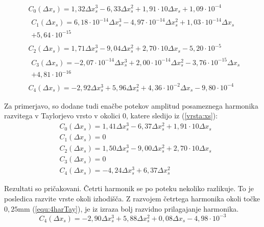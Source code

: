\begin{eqnarray}
\label{nap_lin_xs}
&C_0(\Delta x_s) =1,32\Delta x_s^{3}-6,33\Delta x_s^{2}+1,91\cdot 10\Delta x_s+1,09\cdot 10^{-4} \\                                    
&\begin{split}C_1(\Delta x_s) =6,18\cdot 10^{-14}\Delta x_s^{3}-4,97\cdot 10^{-14}\Delta x_s^{2}+1,03\cdot 10^{-14}\Delta x_s\\+5,64\cdot 10^{-15} \end{split}\\ 
&C_2(\Delta x_s) =1,71\Delta x_s^{3}-9,04\Delta x_s^{2}+2,70\cdot 10\Delta x_s-5,20\cdot 10^{-5} \\                                    
&\begin{split}C_3(\Delta x_s) =-2,07\cdot 10^{-14}\Delta x_s^{3}+2,00\cdot 10^{-14}\Delta x_s^{2}-3,76\cdot 10^{-15}\Delta x_s\\+4,81\cdot 10^{-16} \end{split}\\
\label{nap_lin_xs_zadnji}
&C_4(\Delta x_s) =-2,92\Delta x_s^{3}+5,96\Delta x_s^{2}+4,36\cdot 10^{-2}\Delta x_s-9,80\cdot 10^{-4}
\end{eqnarray}

Za primerjavo, so dodane tudi enačbe potekov amplitud posameznega harmonika razvitega v Taylorjevo vrsto v okolici 0, katere sledijo iz (\ref{vrsta:xs}):
\begin{eqnarray}
&C_0(\Delta x_s) =1,41\Delta x_s^{3}-6,37\Delta x_s^{2}+1,91\cdot 10\Delta x_s \\
&C_1(\Delta x_s) = 0\\
&C_2(\Delta x_s) =1,50\Delta x_s^{3}-9,00\Delta x_s^{2}+2,70\cdot 10\Delta x_s\\
&C_3(\Delta x_s) = 0\\
&C_4(\Delta x_s) =-4,24\Delta x_s^{3}+6,37\Delta x_s^{2}
\end{eqnarray}

Rezultati so pričakovani.
Četrti harmonik se po poteku nekoliko razlikuje. To je posledica razvite vrste okoli izhodišča. Z razvojem četrtega harmonika okoli točke $0,25 \mathrm{ mm}$ (\ref{equ:4harTay}), je iz izraza bolj razvidno prilagajanje harmonika.
\begin{equation}
\label{equ:4harTay}
C_4(\Delta x_s) =-2,90\Delta x_s^{3}+5,88\Delta x_s^{2}+0,08 \Delta x_s - 4,98 \cdot 10^{-3}
\end{equation}


